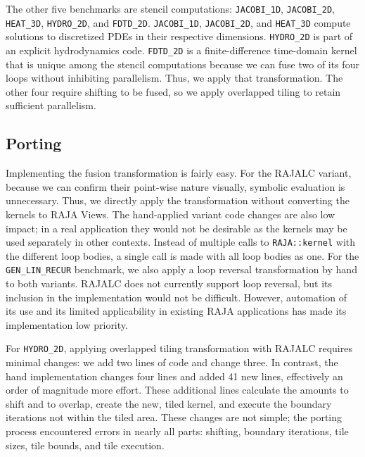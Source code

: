 The other five benchmarks are stencil computations: \verb.JACOBI_1D.,
\verb.JACOBI_2D., \verb.HEAT_3D., \verb.HYDRO_2D., and \verb.FDTD_2D..
\verb.JACOBI_1D., \verb.JACOBI_2D., and \verb.HEAT_3D. compute solutions
to discretized PDEs in their respective dimensions.
\verb.HYDRO_2D. is part of an explicit hydrodynamics code.
\verb.FDTD_2D. is a finite-difference time-domain kernel that is unique
among the stencil computations because we can fuse two of its four loops 
without inhibiting parallelism.
Thus, we apply that transformation.
The other four require shifting to be fused, so we apply overlapped tiling
to retain sufficient parallelism. 

\subsection{Porting}

Implementing the fusion transformation is fairly easy. 
For the RAJALC variant, because we can confirm their point-wise nature
visually, symbolic evaluation is unnecessary.
Thus, we directly apply the transformation without converting the kernels to 
RAJA Views.
The hand-applied variant code changes are also low impact; in a real
application they would not be desirable as the kernels may be used separately
in other contexts.
Instead of multiple calls to \verb.RAJA::kernel. with the different loop
bodies, a single call is made with all loop bodies as one.
For the \verb.GEN_LIN_RECUR. benchmark, we also apply a loop reversal
transformation by hand to both variants. RAJALC does not currently support 
loop reversal, but its inclusion in the implementation would not be difficult.
However, automation of its use and its limited applicability in 
existing RAJA applications has made its implementation low priority. 

For \verb.HYDRO_2D., applying overlapped tiling transformation with RAJALC 
requires minimal changes: we add two lines of code and change three. 
In contrast, the hand implementation changes four lines and added 41
new lines, effectively an order of magnitude more effort. 
These additional lines calculate the amounts to shift and to overlap, 
create the new, tiled kernel, and execute the boundary iterations not
within the tiled area. 
These changes are not simple; the porting process encountered errors
in nearly all parts: shifting, boundary iterations, tile sizes, tile
bounds, and tile execution.

